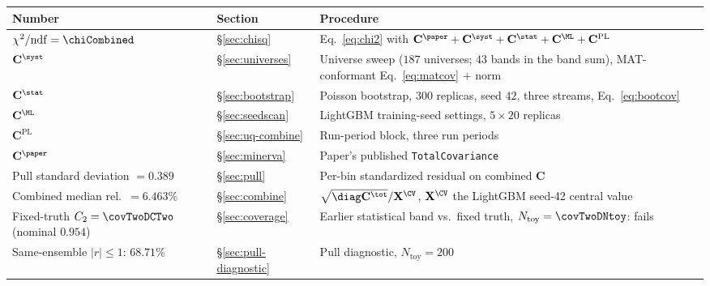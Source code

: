 \begin{center}
\begin{tabularx}{\textwidth}{@{}>{\RaggedRight\arraybackslash}p{}l>{\RaggedRight\arraybackslash}X@{}}
\toprule
Number & Section & Procedure \\
\midrule
$\chi^{2}/\mathrm{ndf} = \chiCombined$ & \S\ref{sec:chisq} &
  Eq.~\eqref{eq:chi2} with $\mathbf{C}^{\paper}+\mathbf{C}^{\syst}+\mathbf{C}^{\stat}+\mathbf{C}^{\ML}+\mathbf{C}^{\mathrm{PL}}$ \\
$\mathbf{C}^{\syst}$ & \S\ref{sec:universes} &
  Universe sweep ($187$ universes; $43$ bands in the band sum), MAT-conformant Eq.~\eqref{eq:matcov} $+$ norm \\
$\mathbf{C}^{\stat}$ & \S\ref{sec:bootstrap} &
  Poisson bootstrap, $300$ replicas, seed $42$, three streams, Eq.~\eqref{eq:bootcov} \\
$\mathbf{C}^{\ML}$ & \S\ref{sec:seedscan} & LightGBM training-seed settings, $5\times20$ replicas \\
$\mathbf{C}^{\mathrm{PL}}$ & \S\ref{sec:uq-combine} & Run-period block, three run periods \\
$\mathbf{C}^{\paper}$ & \S\ref{sec:minerva} & Paper's published \texttt{TotalCovariance} \\
Pull standard deviation $= 0.389$ & \S\ref{sec:pull} & %
  Per-bin standardized residual on combined $\mathbf{C}$ \\
Combined median rel.\ $= 6.463\%$ & \S\ref{sec:combine} & %
  $\sqrt{\diag\mathbf{C}^{\tot}}/\mathbf{X}^{\CV}$, $\mathbf{X}^{\CV}$ the LightGBM seed-42 central value \\
Fixed-truth $C_2=\covTwoDCTwo$ (nominal $0.954$) & \S\ref{sec:coverage} &
  Earlier statistical band vs.\ fixed truth, $N_{\text{toy}}=\covTwoDNtoy$: fails \\
Same-ensemble $|r|\leq1$: $68.71\%$ & \S\ref{sec:pull-diagnostic} &
  Pull diagnostic, $N_{\text{toy}}=200$ \\
\bottomrule
\end{tabularx}
\end{center}


